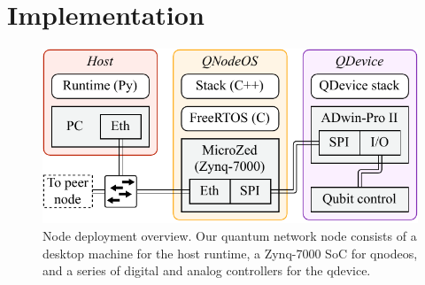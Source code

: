\section{Implementation}
\label{sec:qnodeos:implementation}

\begin{figure}[b]
    \centering
    \includegraphics[width=0.6\linewidth]{figures/node-deployment.pdf}
    \caption{
        Node deployment overview. Our quantum network node consists of a desktop machine for the
        host runtime, a Zynq-7000 SoC for \acrshort{qnodeos}, and a series of digital and analog
        controllers for the \acrshort{qdevice}.
    }
    \label{fig:node-deployment}
\end{figure}

